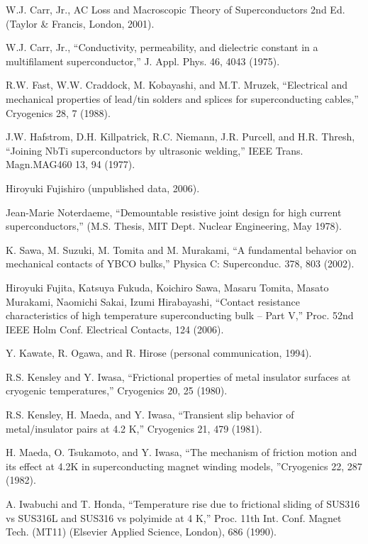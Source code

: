 \noindent [7.17] W.J. Carr, Jr., AC Loss and Macroscopic Theory of Superconductors 2nd Ed. (Taylor \& Francis, London, 2001).

\noindent [7.18] W.J. Carr, Jr., ``Conductivity, permeability, and dielectric constant in a multifilament superconductor,” J. Appl. Phys. 46, 4043 (1975).

\noindent [7.19] R.W. Fast, W.W. Craddock, M. Kobayashi, and M.T. Mruzek, ``Electrical and mechanical properties of lead/tin solders and splices for superconducting cables,” Cryogenics 28, 7 (1988).

\noindent [7.20] J.W. Hafstrom, D.H. Killpatrick, R.C. Niemann, J.R. Purcell, and H.R. Thresh, ``Joining NbTi superconductors by ultrasonic welding,” IEEE Trans. Magn.MAG460 13, 94 (1977).

\noindent [7.21] Hiroyuki Fujishiro (unpublished data, 2006).

\noindent [7.22] Jean-Marie Noterdaeme, ``Demountable resistive joint design for high current superconductors,” (M.S. Thesis, MIT Dept. Nuclear Engineering, May 1978).

\noindent [7.23] K. Sawa, M. Suzuki, M. Tomita and M. Murakami, ``A fundamental behavior on mechanical contacts of YBCO bulks,” Physica C: Superconduc. 378, 803 (2002).

\noindent [7.24] Hiroyuki Fujita, Katsuya Fukuda, Koichiro Sawa, Masaru Tomita, Masato Murakami,
Naomichi Sakai, Izumi Hirabayashi, ``Contact resistance characteristics of
high temperature superconducting bulk – Part V,” Proc. 52nd IEEE Holm Conf.
Electrical Contacts, 124 (2006).

\noindent [7.25] Y. Kawate, R. Ogawa, and R. Hirose (personal communication, 1994).

\noindent [7.26] R.S. Kensley and Y. Iwasa, ``Frictional properties of metal insulator surfaces at cryogenic temperatures,” Cryogenics 20, 25 (1980).

\noindent [7.27] R.S. Kensley, H. Maeda, and Y. Iwasa, ``Transient slip behavior of metal/insulator pairs at 4.2 K,” Cryogenics 21, 479 (1981).

\noindent [7.28] H. Maeda, O. Tsukamoto, and Y. Iwasa, ``The mechanism of friction motion and its effect at 4.2K in superconducting magnet winding models, ”Cryogenics 22, 287 (1982).

\noindent [7.29] A. Iwabuchi and T. Honda, ``Temperature rise due to frictional sliding of SUS316 vs SUS316L and SUS316 vs polyimide at 4 K,” Proc. 11th Int. Conf. Magnet Tech. (MT11) (Elsevier Applied Science, London), 686 (1990).

